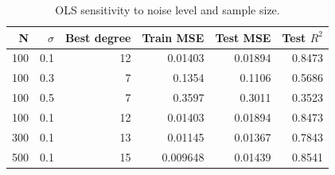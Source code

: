 \begin{table}[htbp]
    \centering
    \caption{OLS sensitivity to noise level and sample size.}
    \label{tab:ols-sensitivity}
\begin{tabular}{rrrrrr}
\hline\hline
N & $\sigma$ & Best degree & Train MSE & Test MSE & Test $R^2$ \\
\hline
100 & 0.1 & 12 & 0.01403 & 0.01894 & 0.8473 \\
100 & 0.3 & 7 & 0.1354 & 0.1106 & 0.5686 \\
100 & 0.5 & 7 & 0.3597 & 0.3011 & 0.3523 \\
100 & 0.1 & 12 & 0.01403 & 0.01894 & 0.8473 \\
300 & 0.1 & 13 & 0.01145 & 0.01367 & 0.7843 \\
500 & 0.1 & 15 & 0.009648 & 0.01439 & 0.8541 \\
\hline\hline
\end{tabular}
\end{table}
